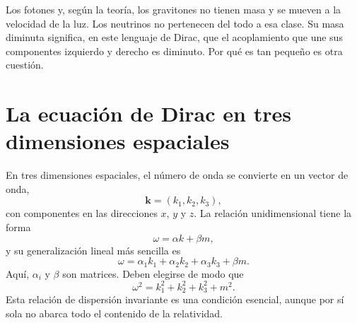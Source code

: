 \begin{classroomqa}
\end{classroomqa}

Los fotones y, según la teoría, los gravitones no tienen masa y se mueven a la velocidad de la luz. Los neutrinos no pertenecen del todo a esa clase. Su masa diminuta significa, en este lenguaje de Dirac, que el acoplamiento que une sus componentes izquierdo y derecho es diminuto. Por qué es tan pequeño es otra cuestión.

\section{La ecuación de Dirac en tres dimensiones espaciales}

En tres dimensiones espaciales, el número de onda se convierte en un vector de onda,
\begin{equation}
\mathbf{k}=(k_1,k_2,k_3),
\end{equation}
con componentes en las direcciones \(x\), \(y\) y \(z\). La relación unidimensional tiene la forma
\begin{equation}
\omega=\alpha k+\beta m,
\end{equation}
y su generalización lineal más sencilla es
\begin{equation}
\omega
=
\alpha_1 k_1+\alpha_2 k_2+\alpha_3 k_3+\beta m.
\end{equation}
Aquí, \(\alpha_i\) y \(\beta\) son matrices. Deben elegirse de modo que
\begin{equation}
\omega^2=k_1^2+k_2^2+k_3^2+m^2.
\end{equation}
Esta relación de dispersión invariante es una condición esencial, aunque por sí sola no abarca todo el contenido de la relatividad.

